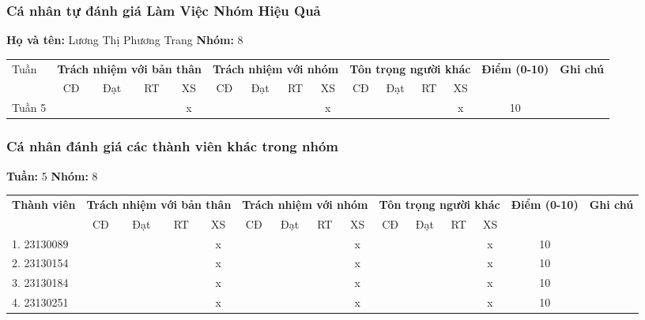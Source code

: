 \subsubsection*{Cá nhân tự đánh giá Làm Việc Nhóm Hiệu Quả}

\noindent \textbf{Họ và tên:} Lương Thị Phương Trang \hrulefill \quad \textbf{Nhóm:} 8 \hrulefill

\vspace{0.5cm}

\begin{tabularx}{\linewidth}{|X|c|c|c|c|c|c|c|c|c|c|c|c|c|c|}
\hline
Tuần & \multicolumn{4}{c|}{\textbf{Trách nhiệm với bản thân}} & \multicolumn{4}{c|}{\textbf{Trách nhiệm với nhóm}} & \multicolumn{4}{c|}{\textbf{Tôn trọng người khác}} & \multirow{2}{1.5cm}{\textbf{Điểm (0-10)}} & \multirow{2}{1.5cm}{\textbf{Ghi chú}} \\ \cline{2-13}
 & CĐ & Đạt & RT & XS & CĐ & Đạt & RT & XS & CĐ & Đạt & RT & XS & & \\ \hline
  Tuần 5 & & & & x & & & & x & & & & x & 10 & \\ \hline
\end{tabularx}

\vspace{1cm}

\subsubsection*{Cá nhân đánh giá các thành viên khác trong nhóm}

\noindent \textbf{Tuần:} 5 \hrulefill \quad \textbf{Nhóm:} 8 \hrulefill

\vspace{0.5cm}

\begin{tabularx}{\linewidth}{|X|c|c|c|c|c|c|c|c|c|c|c|c|c|c|}
\hline
\multirow{2}{3cm}{\textbf{Thành viên}} & \multicolumn{4}{c|}{\textbf{Trách nhiệm với bản thân}} & \multicolumn{4}{c|}{\textbf{Trách nhiệm với nhóm}} & \multicolumn{4}{c|}{\textbf{Tôn trọng người khác}} & \multirow{2}{1.2cm}{\textbf{Điểm (0-10)}} & \multirow{2}{1.5cm}{\textbf{Ghi chú}} \\ \cline{2-13}
 & CĐ & Đạt & RT & XS & CĐ & Đạt & RT & XS & CĐ & Đạt & RT & XS & & \\ \hline
1. 23130089 & & & & x & & & & x & & & & x & 10 & \\ \hline
2. 23130154 & & & & x & & & & x & & & & x & 10 & \\ \hline
3. 23130184 & & & & x & & & & x & & & & x & 10 & \\ \hline
4. 23130251 & & & & x & & & & x & & & & x & 10 & \\ \hline
\end{tabularx}
